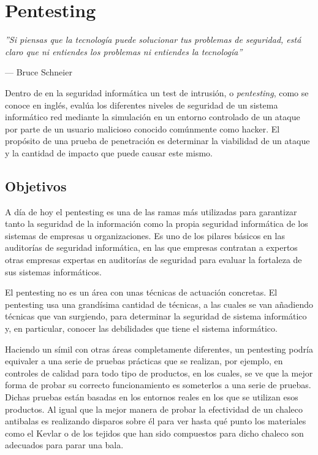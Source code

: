 \chapter{Pentesting}

\epigraph{\textit{''Si piensas que la tecnología puede solucionar tus problemas de seguridad, está claro que ni entiendes los problemas ni entiendes la tecnología''}}{--- Bruce Schneier}

Dentro de en la seguridad informática un test de intrusión, o \textit{pentesting}, como se conoce en inglés, evalúa los diferentes niveles de seguridad de un sistema informático red mediante la simulación en un entorno controlado de un ataque por parte de un usuario malicioso conocido comúnmente como hacker\cite{pentesting-kali}. El propósito de una prueba de penetración es determinar la viabilidad de un ataque y la cantidad de impacto que puede causar este mismo.

\section{Objetivos}

A día de hoy el pentesting es una de las ramas más utilizadas para garantizar tanto la seguridad de la información como la propia seguridad informática de los sistemas de empresas u organizaciones. Es uno de los pilares básicos en las auditorías de seguridad informática, en las que empresas contratan a expertos otras empresas expertas en auditorías de seguridad para evaluar la fortaleza de sus sistemas informáticos.

El pentesting no es un área con unas técnicas de actuación concretas. El pentesting usa una grandísima cantidad de técnicas, a las cuales se van añadiendo técnicas que van surgiendo, para determinar la seguridad de sistema informático y, en particular, conocer las debilidades que tiene el sistema informático.

Haciendo un símil con otras áreas completamente diferentes, un pentesting podría equivaler a una serie de pruebas prácticas que se realizan, por ejemplo, en controles de calidad para todo tipo de productos, en los cuales, se ve que la mejor forma de probar su correcto funcionamiento es someterlos a una serie de pruebas. Dichas pruebas están basadas en los entornos reales en los que se utilizan esos productos. Al igual que la mejor manera de probar la efectividad de un chaleco antibalas es realizando disparos sobre él para ver hasta qué punto los materiales como el Kevlar o de los tejidos que han sido compuestos para dicho chaleco son adecuados para parar una bala.

